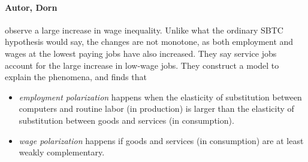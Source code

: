 \documentclass[12pt, a4paper]{article}
\begin{document}
\begin{multicols}{2}
\paragraph{Autor, Dorn} observe a large increase in wage inequality. Unlike what the ordinary SBTC hypothesis would say, the changes are not monotone, as both employment and wages at the lowest paying jobs have also increased. They say service jobs account for the large increase in low-wage jobs. They construct a model to explain the phenomena, and finds that
\begin{itemize}
\item \textit{employment polarization} happens when the elasticity of substitution between computers and routine labor (in production) is larger than the elasticity of substitution between goods and services (in consumption).
\item \textit{wage polarization} happens if goods and services (in consumption) are at least weakly complementary.
\end{itemize}



\end{multicols}
\end{document}
